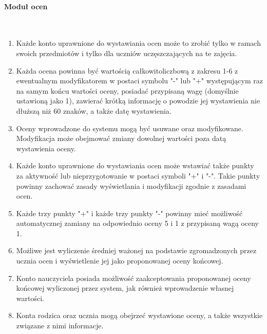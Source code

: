 \documentclass{article}
\begin{document}
\paragraph{Moduł ocen} \mbox{}\\
\begin{enumerate}
	\item Każde konto uprawnione do wystawiania ocen może to zrobić tylko w ramach swoich przedmiotów i tylko dla uczniów uczęszczających na te zajęcia.
    \item Każda ocena powinna być wartością całkowitoliczbową z zakresu 1-6 z ewentualnym modyfikatorem w postaci symbolu "-" lub "+" występującym raz na samym końcu wartości oceny, posiadać przypisaną wagę (domyślnie ustawioną jako 1), zawierać krótką informację o powodzie jej wystawienia nie dłuższą niż 60 znaków, a także datę wystawienia.
    \item Oceny wprowadzone do systemu mogą być usuwane oraz modyfikowane. Modyfikacja może obejmować zmiany dowolnej wartości poza datą wystawienia oceny.
    \item Każde konto uprawnione do wystawiania ocen może wstawiać także punkty za aktywność lub nieprzygotowanie w postaci symboli "+" i "-". Takie punkty powinny zachować zasady wyświetlania i modyfikacji zgodnie z zasadami ocen.
	\item Każde trzy punkty "+" i każde trzy punkty "-" powinny mieć możliwość automatycznej zamiany na odpowiednio oceny 5 i 1 z przypisaną wagą oceny 1.
    \item Możliwe jest wyliczenie średniej ważonej na podstawie zgromadzonych przez ucznia ocen i wyświetlenie jej jako proponowanej oceny końcowej.
    \item Konto nauczyciela posiada możliwość zaakceptowania proponowanej oceny końcowej wyliczonej przez system, jak również wprowadzenie własnej wartości.
    \item Konta rodzica oraz ucznia mogą obejrzeć wystawione oceny, a także wszystkie związane z nimi informacje.
\end{enumerate}
\end{document}
